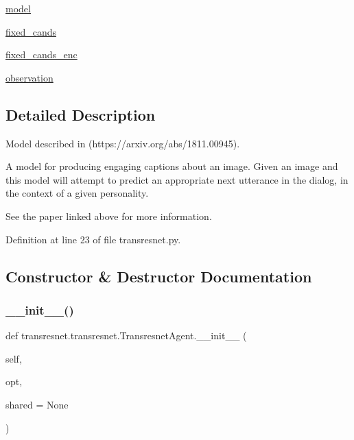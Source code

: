 \begin{DoxyCompactItemize}
\item 
\hyperlink{classtransresnet_1_1transresnet_1_1TransresnetAgent_a5475f88831303300882b44c150ab7b1b}{model}
\item 
\hyperlink{classtransresnet_1_1transresnet_1_1TransresnetAgent_ae1c8b1b18d0bb9d0c9541dcfdceef831}{fixed\+\_\+cands}
\item 
\hyperlink{classtransresnet_1_1transresnet_1_1TransresnetAgent_a612afc3da9e6b241f9103284406e2bc9}{fixed\+\_\+cands\+\_\+enc}
\item 
\hyperlink{classtransresnet_1_1transresnet_1_1TransresnetAgent_a468ba9e599d6b6f51261729974763b82}{observation}
\end{DoxyCompactItemize}


\subsection{Detailed Description}
\begin{DoxyVerb}Model described in (https://arxiv.org/abs/1811.00945).

A model for producing engaging captions about an image. Given an image and
this model will attempt to predict an appropriate
next utterance in the dialog, in the context of a given personality.

See the paper linked above for more information.
\end{DoxyVerb}
 

Definition at line 23 of file transresnet.\+py.



\subsection{Constructor \& Destructor Documentation}
\mbox{\label{classtransresnet_1_1transresnet_1_1TransresnetAgent_a870c5ec03eb32691de40d3b0af17626e}} 
\subsubsection{\texorpdfstring{\+\_\+\+\_\+init\+\_\+\+\_\+()}{\_\_init\_\_()}}
{\footnotesize\ttfamily def transresnet.\+transresnet.\+Transresnet\+Agent.\+\_\+\+\_\+init\+\_\+\+\_\+ (\begin{DoxyParamCaption}\item[{}]{self,  }\item[{}]{opt,  }\item[{}]{shared = {\ttfamily None} }\end{DoxyParamCaption})}



